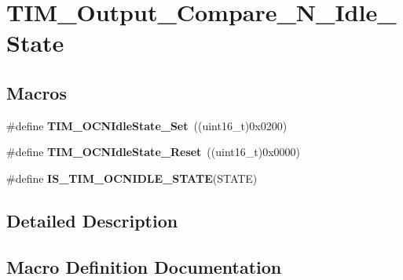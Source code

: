 \hypertarget{group___t_i_m___output___compare___n___idle___state}{}\section{T\+I\+M\+\_\+\+Output\+\_\+\+Compare\+\_\+\+N\+\_\+\+Idle\+\_\+\+State}
\label{group___t_i_m___output___compare___n___idle___state}
\subsection*{Macros}
\begin{DoxyCompactItemize}
\item 
\#define {\bfseries T\+I\+M\+\_\+\+O\+C\+N\+Idle\+State\+\_\+\+Set}~((uint16\+\_\+t)0x0200)\hypertarget{group___t_i_m___output___compare___n___idle___state_ga980392da6eb5bedcbf7ed353e1073f99}{}\label{group___t_i_m___output___compare___n___idle___state_ga980392da6eb5bedcbf7ed353e1073f99}

\item 
\#define {\bfseries T\+I\+M\+\_\+\+O\+C\+N\+Idle\+State\+\_\+\+Reset}~((uint16\+\_\+t)0x0000)\hypertarget{group___t_i_m___output___compare___n___idle___state_ga329a32820cdba0af9c4b7a04177e8fdd}{}\label{group___t_i_m___output___compare___n___idle___state_ga329a32820cdba0af9c4b7a04177e8fdd}

\item 
\#define {\bfseries I\+S\+\_\+\+T\+I\+M\+\_\+\+O\+C\+N\+I\+D\+L\+E\+\_\+\+S\+T\+A\+TE}(S\+T\+A\+TE)
\end{DoxyCompactItemize}


\subsection{Detailed Description}


\subsection{Macro Definition Documentation}
